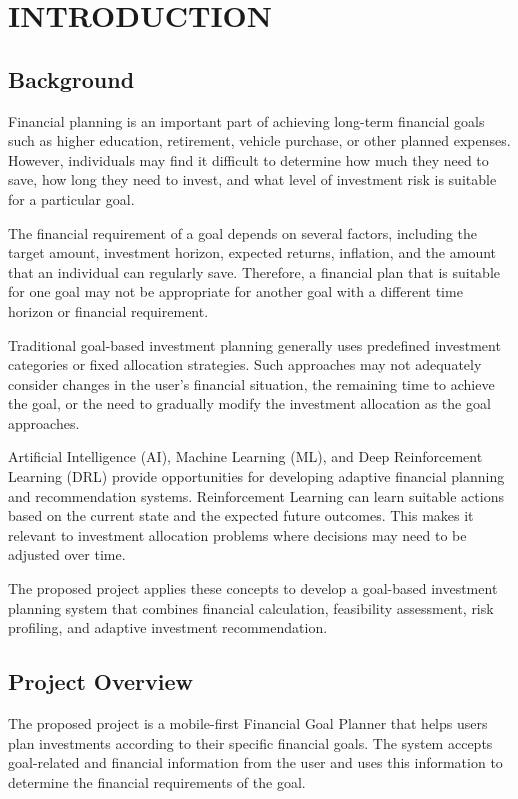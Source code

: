 \chapter[\uppercase{Introduction}]{\uppercase{Introduction}}

\section{Background}
Financial planning is an important part of achieving long-term financial goals such as higher education, retirement, vehicle purchase, or other planned expenses. However, individuals may find it difficult to determine how much they need to save, how long they need to invest, and what level of investment risk is suitable for a particular goal.

The financial requirement of a goal depends on several factors, including the target amount, investment horizon, expected returns, inflation, and the amount that an individual can regularly save. Therefore, a financial plan that is suitable for one goal may not be appropriate for another goal with a different time horizon or financial requirement.

Traditional goal-based investment planning generally uses predefined investment categories or fixed allocation strategies. Such approaches may not adequately consider changes in the user's financial situation, the remaining time to achieve the goal, or the need to gradually modify the investment allocation as the goal approaches.

Artificial Intelligence (AI), Machine Learning (ML), and Deep Reinforcement Learning (DRL) provide opportunities for developing adaptive financial planning and recommendation systems. Reinforcement Learning can learn suitable actions based on the current state and the expected future outcomes. This makes it relevant to investment allocation problems where decisions may need to be adjusted over time.

The proposed project applies these concepts to develop a goal-based investment planning system that combines financial calculation, feasibility assessment, risk profiling, and adaptive investment recommendation.

\section{Project Overview}
The proposed project is a mobile-first Financial Goal Planner that helps users plan investments according to their specific financial goals. The system accepts goal-related and financial information from the user and uses this information to determine the financial requirements of the goal.

